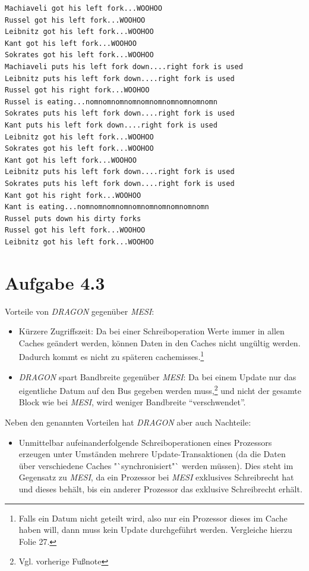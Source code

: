 \documentclass[a4paper,
12pt,
BCOR12mm,
]{scrartcl}
\begin{document}
\begin{verbatim}
Machiaveli got his left fork...WOOHOO
Russel got his left fork...WOOHOO
Leibnitz got his left fork...WOOHOO
Kant got his left fork...WOOHOO
Sokrates got his left fork...WOOHOO
Machiaveli puts his left fork down....right fork is used
Leibnitz puts his left fork down....right fork is used
Russel got his right fork...WOOHOO
Russel is eating...nomnomnomnomnomnomnomnomnomnomn
Sokrates puts his left fork down....right fork is used
Kant puts his left fork down....right fork is used
Leibnitz got his left fork...WOOHOO
Sokrates got his left fork...WOOHOO
Kant got his left fork...WOOHOO
Leibnitz puts his left fork down....right fork is used
Sokrates puts his left fork down....right fork is used
Kant got his right fork...WOOHOO
Kant is eating...nomnomnomnomnomnomnomnomnomnomn
Russel puts down his dirty forks
Russel got his left fork...WOOHOO
Leibnitz got his left fork...WOOHOO
\end{verbatim}
\section*{Aufgabe 4.3}
Vorteile von \emph{DRAGON} gegenüber \emph{MESI}:
\begin{itemize}
	\item Kürzere Zugriffszeit: Da bei einer Schreiboperation Werte immer in allen Caches
		geändert werden, können Daten in den Caches nicht ungültig werden. Dadurch kommt es 
		nicht zu späteren cachemisses.\footnote{Falls ein Datum nicht geteilt wird, also nur
		ein Prozessor dieses im Cache haben will, dann muss kein Update durchgeführt werden.
		Vergleiche hierzu Folie 27.}
	\item \emph{DRAGON} spart Bandbreite gegenüber \emph{MESI}: Da bei einem Update nur das
		eigentliche Datum auf den Bus gegeben werden muss,\footnote{Vgl. vorherige Fußnote} und nicht der gesamte Block wie bei
		\emph{MESI}, wird weniger Bandbreite "`verschwendet"'.
\end{itemize}

Neben den genannten Vorteilen hat \emph{DRAGON} aber auch Nachteile:
\begin{itemize}
	\item Unmittelbar aufeinanderfolgende Schreiboperationen eines Prozessors erzeugen unter
		Umständen mehrere Update-Transaktionen (da die Daten über verschiedene Caches "`synchronisiert"`
		werden müssen). Dies steht im Gegensatz zu \emph{MESI}, da ein Prozessor bei
		\emph{MESI} exklusives Schreibrecht hat und dieses behält, bis ein anderer Prozessor
		das exklusive Schreibrecht erhält.
\end{itemize}
\end{document}
